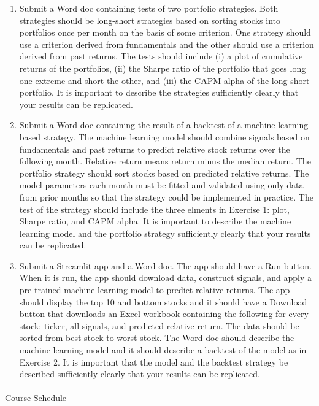 \documentclass[
  letterpaper,
  DIV=11,
  numbers=noendperiod]{scrartcl}
\makeatletter
\let\oldparagraph\paragraph
\renewcommand{\paragraph}{
    \@ifstar
      \xxxParagraphStar
      \xxxParagraphNoStar
  }
\newcommand{\xxxParagraphStar}[1]{\oldparagraph*{#1}\mbox{}}
\newcommand{\xxxParagraphNoStar}[1]{\oldparagraph{#1}\mbox{}}
\providecommand{\tightlist}{%
  \setlength{\itemsep}{0pt}\setlength{\parskip}{0pt}}\usepackage{longtable,booktabs,array}
\makeatother
\begin{document}
\begin{enumerate}
\def\labelenumi{\arabic{enumi}.}
\tightlist
\item
  Submit a Word doc containing tests of two portfolio strategies. Both
  strategies should be long-short strategies based on sorting stocks
  into portfolios once per month on the basis of some criterion. One
  strategy should use a criterion derived from fundamentals and the
  other should use a criterion derived from past returns. The tests
  should include (i) a plot of cumulative returns of the portfolios,
  (ii) the Sharpe ratio of the portfolio that goes long one extreme and
  short the other, and (iii) the CAPM alpha of the long-short portfolio.
  It is important to describe the strategies sufficiently clearly that
  your results can be replicated.
\item
  Submit a Word doc containing the result of a backtest of a
  machine-learning-based strategy. The machine learning model should
  combine signals based on fundamentals and past returns to predict
  relative stock returns over the following month. Relative return means
  return minus the median return. The portfolio strategy should sort
  stocks based on predicted relative returns. The model parameters each
  month must be fitted and validated using only data from prior months
  so that the strategy could be implemented in practice. The test of the
  strategy should include the three elments in Exercise 1: plot, Sharpe
  ratio, and CAPM alpha. It is important to describe the machine
  learning model and the portfolio strategy sufficiently clearly that
  your results can be replicated.
\item
  Submit a Streamlit app and a Word doc. The app should have a Run
  button. When it is run, the app should download data, construct
  signals, and apply a pre-trained machine learning model to predict
  relative returns. The app should display the top 10 and bottom stocks
  and it should have a Download button that downloads an Excel workbook
  containing the following for every stock: ticker, all signals, and
  predicted relative return. The data should be sorted from best stock
  to worst stock. The Word doc should describe the machine learning
  model and it should describe a backtest of the model as in Exercise 2.
  It is important that the model and the backtest strategy be described
  sufficiently clearly that your results can be replicated.
\end{enumerate}

\paragraph{Course Schedule}\label{course-schedule}
\end{document}
